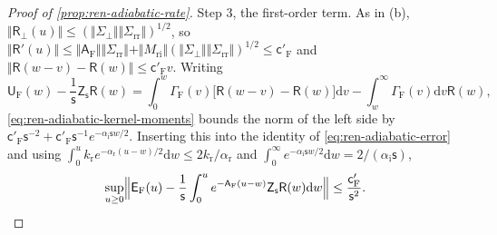 \begin{proof}[Proof of \cref{prop:ren-adiabatic-rate}]
Step 3, the first-order term. As in (b), $\Vert\mathsf R_\perp(u)\Vert\le(\Vert\Sigma_\perp\Vert\Vert\Sigma_{\mathrm{rr}}\Vert)^{1/2}$, so $\Vert\mathsf R'(u)\Vert\le\Vert\mathsf A_{\mathrm F}\Vert\Vert\Sigma_{\mathrm{rr}}\Vert+\Vert M_{\mathrm{ri}}\Vert(\Vert\Sigma_\perp\Vert\Vert\Sigma_{\mathrm{rr}}\Vert)^{1/2}\le\mathsf c'_{\mathrm F}$ and $\Vert\mathsf R(w-v)-\mathsf R(w)\Vert\le\mathsf c'_{\mathrm F}v$. Writing
\[
\mathsf U_{\mathrm F}(w)-\frac1{\mathsf s}\mathsf Z_{\mathsf s}\mathsf R(w)=\int_0^w\Gamma_{\mathrm F}(v)\bigl[\mathsf R(w-v)-\mathsf R(w)\bigr]\mathrm dv-\int_w^\infty\Gamma_{\mathrm F}(v)\mathrm dv\mathsf R(w),
\]
\eqref{eq:ren-adiabatic-kernel-moments} bounds the norm of the left side by $\mathsf c'_{\mathrm F}\mathsf s^{-2}+\mathsf c'_{\mathrm F}\mathsf s^{-1}e^{-\alpha_{\mathrm i}\mathsf sw/2}$. Inserting this into the identity of \eqref{eq:ren-adiabatic-error} and using $\int_0^uk_{\mathrm r}e^{-\alpha_{\mathrm r}(u-w)/2}\mathrm dw\le2k_{\mathrm r}/\alpha_{\mathrm r}$ and $\int_0^\infty e^{-\alpha_{\mathrm i}\mathsf sw/2}\mathrm dw=2/(\alpha_{\mathrm i}\mathsf s)$,
\[
\sup_{u\ge0}\Bigl\Vert\mathsf E_{\mathrm F}(u)-\frac1{\mathsf s}\int_0^ue^{-\mathsf A_{\mathrm F}(u-w)}\mathsf Z_{\mathsf s}\mathsf R(w)\mathrm dw\Bigr\Vert\le\frac{\mathsf c'_{\mathrm F}}{\mathsf s^2}.
\]

\end{proof}
